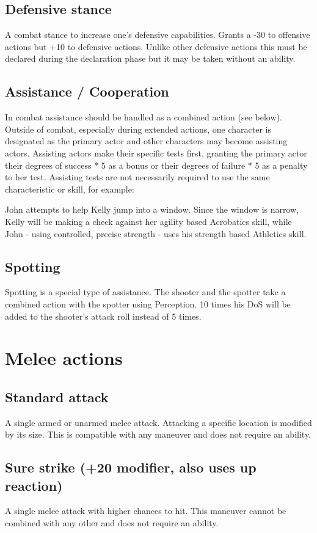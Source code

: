 \documentclass[12pt,a4paper,openany]{book}
\newenvironment{exampleblock}[1][1]
{\hfill\begin{minipage}{\dimexpr\textwidth-#1cm}}
{\end{minipage}\par}
\begin{document}
	\subsection*{Defensive stance}
	A combat stance to increase one’s defensive capabilities. Grants a -30 to offensive actions but +10 to defensive actions. Unlike other defensive actions this must be declared during the declaration phase but it may be taken without an ability.
	\subsection*{Assistance / Cooperation}
	In combat assistance should be handled as a combined action (see below). Outside of combat, especially during extended actions, one character is designated as the primary actor and other characters may become assisting actors. Assisting actors make their specific tests first, granting the primary actor their degrees of success * 5 as a bonus or their degrees of failure * 5 as a penalty to her test. Assisting tests are not necessarily required to use the same characteristic or skill, for example:
	
	\begin{exampleblock}
		John attempts to help Kelly jump into a window. Since the window is narrow, Kelly will be making a check against her agility based Acrobatics skill, while John - using controlled, precise strength - uses his strength based Athletics skill.
	\end{exampleblock}
	\subsection*{Spotting}
	Spotting is a special type of assistance. The shooter and the spotter take a combined action with the spotter using Perception. 10 times his DoS will be added to the shooter’s attack roll instead of 5 times.
	\section{Melee actions}
	\subsection*{Standard attack}
	A single armed or unarmed melee attack. Attacking a specific location is modified by its size. This is compatible with any maneuver and does not require an ability. 
	\subsection*{Sure strike (+20 modifier, also uses up reaction)}
	A single melee attack with higher chances to hit. This maneuver cannot be combined with any other and does not require an ability.
\end{document}
